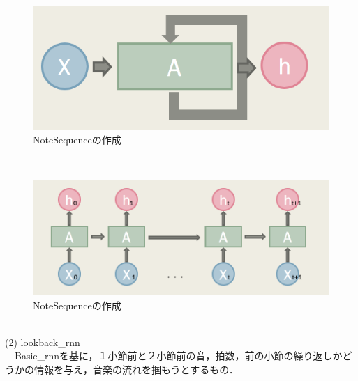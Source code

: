 \begin{figure}[!ht]
    \begin{screen}
    \begin{center}
        \includegraphics[scale=1, clip]{./img/basic3.png}
        \caption{NoteSequenceの作成}
        \label{fig:NoteSequenceの作成}
    \end{center}
    \end{screen}
\end{figure} \\
\begin{figure}[!ht]
    \begin{screen}
    \begin{center}
        \includegraphics[scale=0.8, clip]{./img/basic4.png}
        \caption{NoteSequenceの作成}
        \label{fig:NoteSequenceの作成}
    \end{center}
    \end{screen}
\end{figure} \\
(2) lookback\_rnn\\
　Basic\_rnnを基に，１小節前と２小節前の音，拍数，前の小節の繰り返しかどうかの情報を与え，音楽の流れを掴もうとするもの．\\
\newpage
